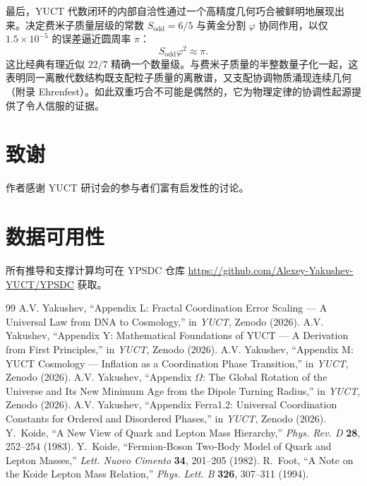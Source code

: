 \documentclass[11pt,a4paper]{article}
\theoremstyle{remark}
\begin{document}
	最后，YUCT 代数闭环的内部自洽性通过一个高精度几何巧合被鲜明地展现出来。决定费米子质量层级的常数 \(S_{\mathrm{odd}}=6/5\) 与黄金分割 \(\varphi\) 协同作用，以仅 \(1.5\times10^{-5}\) 的误差逼近圆周率 \(\pi\)：
	\[
	S_{\mathrm{odd}}\varphi^2 \approx \pi .
	\]
	这比经典有理近似 \(22/7\) 精确一个数量级。与费米子质量的半整数量子化一起，这表明同一离散代数结构既支配粒子质量的离散谱，又支配协调物质涌现连续几何（附录 Ehrenfest）。如此双重巧合不可能是偶然的，它为物理定律的协调性起源提供了令人信服的证据。
	
	\section*{致谢}
	
	作者感谢 YUCT 研讨会的参与者们富有启发性的讨论。
	
	\section*{数据可用性}
	
	所有推导和支撑计算均可在 YPSDC 仓库 \url{https://github.com/Alexey-Yakushev-YUCT/YPSDC} 获取。
	
	\begin{thebibliography}{99}
		 A.V. Yakushev, ``Appendix L: Fractal Coordination Error Scaling — A Universal Law from DNA to Cosmology,'' in \emph{YUCT}, Zenodo (2026).
		 A.V. Yakushev, ``Appendix Y: Mathematical Foundations of YUCT — A Derivation from First Principles,'' in \emph{YUCT}, Zenodo (2026).
		 A.V. Yakushev, ``Appendix M: YUCT Cosmology — Inflation as a Coordination Phase Transition,'' in \emph{YUCT}, Zenodo (2026).
		 A.V. Yakushev, ``Appendix $\Omega$: The Global Rotation of the Universe and Its New Minimum Age from the Dipole Turning Radius,'' in \emph{YUCT}, Zenodo (2026).
		 A.V. Yakushev, ``Appendix Ferra1.2: Universal Coordination Constants for Ordered and Disordered Phases,'' in \emph{YUCT}, Zenodo (2026).
		 Y.~Koide, ``A New View of Quark and Lepton Mass Hierarchy,''
		\emph{Phys. Rev. D} \textbf{28}, 252--254 (1983).
		 Y.~Koide, ``Fermion‑Boson Two‑Body Model of Quark and Lepton Masses,''
		\emph{Lett. Nuovo Cimento} \textbf{34}, 201--205 (1982).
		 R.~Foot, ``A Note on the Koide Lepton Mass Relation,''
		\emph{Phys. Lett. B} \textbf{326}, 307--311 (1994).
	\end{thebibliography}
	
\end{document}
